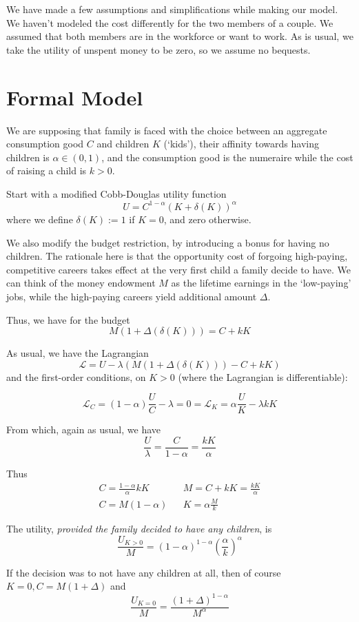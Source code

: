 \documentclass{homework}
\begin{document}
We have made a few assumptions and simplifications while making our model. We haven’t modeled the cost differently for the two members of a couple. We assumed that both members are in the workforce or want to work. As is usual, we take the utility of unspent money to be zero, so we assume no bequests.


\section{Formal Model}
We are supposing that family is faced with the choice between an aggregate consumption good $C$ and children $K$ (`kids'), their affinity towards having children is $\alpha\in(0,1)$, and the consumption good is the numeraire while the cost of raising a child is $k>0$.

Start with a modified Cobb-Douglas utility function \[U=C^{1-\alpha} (K+\delta(K))^\alpha\]
where we define $\delta(K) := 1$ if $K=0$, and zero otherwise.

We also modify the budget restriction, by introducing a bonus for having no children. The rationale here is that the opportunity cost of forgoing high-paying, competitive careers takes effect at the very first child a family decide to have. We can think of the money endowment $M$ as the lifetime earnings in the `low-paying' jobs, while the high-paying careers yield additional amount $\Delta$.

Thus, we have for the budget \[M (1+\Delta (\delta(K))) = C + kK \]

As usual, we have the Lagrangian \[\mathcal{L} = U - \lambda (M (1+\Delta (\delta(K))) - C + kK )\]
and the first-order conditions, on $K>0$ (where the Lagrangian is differentiable):

\[ \mathcal{L}_C = (1-\alpha)\frac{U}{C} - \lambda = 0 = \mathcal{L}_K = \alpha\frac{U}{K} - \lambda kK\]

From which, again as usual, we have \[\frac{U}{\lambda} = \frac{C}{1-\alpha} = \frac{kK}{\alpha} \]

Thus
\begin{align}
C = \frac{1-\alpha}{\alpha} kK  & & M = C+kK = \frac{kK}{\alpha} \\
C = M(1-\alpha) & & K = \alpha\frac{M}{k}
\end{align}

The utility, \emph{provided the family decided to have any children}, is \[\frac{U_{K>0}}{M} = (1-\alpha)^{1-\alpha} \left(\frac{\alpha}{k}\right)^\alpha\]

If the decision was to not have any children at all, then of course $K=0, C=M(1+\Delta)$ and
\[\frac{U_{K=0}}{M} = \frac{(1+\Delta)^{1-\alpha}}{M^\alpha}\]
\end{document}
